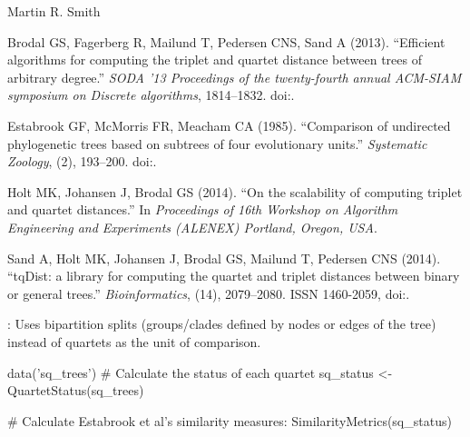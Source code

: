 \documentclass[a4paper]{book}
\begin{document}
%
\begin{Author}\relax
Martin R. Smith
\end{Author}
%
\begin{References}\relax

Brodal GS, Fagerberg R, Mailund T, Pedersen CNS, Sand A (2013).
``Efficient algorithms for computing the triplet and quartet distance between trees of arbitrary degree.''
\emph{SODA '13 Proceedings of the twenty-fourth annual ACM-SIAM symposium on Discrete algorithms}, 1814--1832.
doi:\nobreakspace{}.

Estabrook GF, McMorris FR, Meacham CA (1985).
``Comparison of undirected phylogenetic trees based on subtrees of four evolutionary units.''
\emph{Systematic Zoology}, (2), 193--200.
doi:\nobreakspace{}.

Holt MK, Johansen J, Brodal GS (2014).
``On the scalability of computing triplet and quartet distances.''
In \emph{Proceedings of 16th Workshop on Algorithm Engineering and Experiments (ALENEX) Portland, Oregon, USA}.

Sand A, Holt MK, Johansen J, Brodal GS, Mailund T, Pedersen CNS (2014).
``tqDist: a library for computing the quartet and triplet distances between binary or general trees.''
\emph{Bioinformatics}, (14), 2079--2080.
ISSN 1460-2059, doi:\nobreakspace{}.

\end{References}
%
\begin{SeeAlso}\relax
{}: Uses bipartition splits (groups/clades defined by
nodes or edges of the tree) instead of quartets as the unit of comparison.
\end{SeeAlso}
%
\begin{Examples}
\begin{ExampleCode}
 data('sq_trees')
 # Calculate the status of each quartet
 sq_status <- QuartetStatus(sq_trees)

 # Calculate Estabrook et al's similarity measures:
 SimilarityMetrics(sq_status)


\end{ExampleCode}
\end{Examples}
\end{document}
